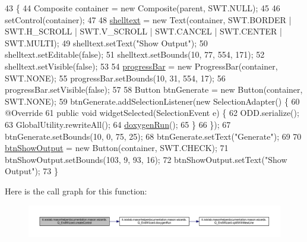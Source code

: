 \begin{DoxyCode}
43                                                 \{
44         Composite container = \textcolor{keyword}{new} Composite(parent, SWT.NULL);
45 
46         setControl(container);
47         
48         \hyperlink{classit_1_1isislab_1_1masonhelperdocumentation_1_1mason_1_1wizards_1_1_q___end_wizard_ab4650e9141ffb45563506bcf2b5daa4e}{shelltext} = \textcolor{keyword}{new} Text(container, SWT.BORDER | SWT.H\_SCROLL | SWT.V\_SCROLL | SWT.CANCEL | 
      SWT.CENTER | SWT.MULTI);
49         shelltext.setText(\textcolor{stringliteral}{"Show Output"});
50         shelltext.setEditable(\textcolor{keyword}{false});
51         shelltext.setBounds(10, 77, 554, 171);
52         shelltext.setVisible(\textcolor{keyword}{false});
53         
54         \hyperlink{classit_1_1isislab_1_1masonhelperdocumentation_1_1mason_1_1wizards_1_1_q___end_wizard_a43d65086e656c40478f720a0a9cac522}{progressBar} = \textcolor{keyword}{new} ProgressBar(container, SWT.NONE);
55         progressBar.setBounds(10, 31, 554, 17);
56         progressBar.setVisible(\textcolor{keyword}{false});
57         
58         Button btnGenerate = \textcolor{keyword}{new} Button(container, SWT.NONE);
59         btnGenerate.addSelectionListener(\textcolor{keyword}{new} SelectionAdapter() \{
60             @Override
61             \textcolor{keyword}{public} \textcolor{keywordtype}{void} widgetSelected(SelectionEvent e) \{
62                 ODD.serialize();
63                 GlobalUtility.rewriteAll();
64                 \hyperlink{classit_1_1isislab_1_1masonhelperdocumentation_1_1mason_1_1wizards_1_1_q___end_wizard_a5711bf4858bd7e5787743ec96669a19d}{doxygenRun}();
65             \}
66         \});
67         btnGenerate.setBounds(10, 0, 75, 25);
68         btnGenerate.setText(\textcolor{stringliteral}{"Generate"});
69         
70         \hyperlink{classit_1_1isislab_1_1masonhelperdocumentation_1_1mason_1_1wizards_1_1_q___end_wizard_adabc78dc53c9ffd3c77d6e453db02cb6}{btnShowOutput} = \textcolor{keyword}{new} Button(container, SWT.CHECK);
71         btnShowOutput.setBounds(103, 9, 93, 16);
72         btnShowOutput.setText(\textcolor{stringliteral}{"Show Output"});
73     \}
\end{DoxyCode}


Here is the call graph for this function\-:
\nopagebreak
\begin{figure}[H]
\begin{center}
\leavevmode
\includegraphics[width=350pt]{classit_1_1isislab_1_1masonhelperdocumentation_1_1mason_1_1wizards_1_1_q___end_wizard_a5370c5c6b82b0ae5dc3fede5a15bb871_cgraph}
\end{center}
\end{figure}


